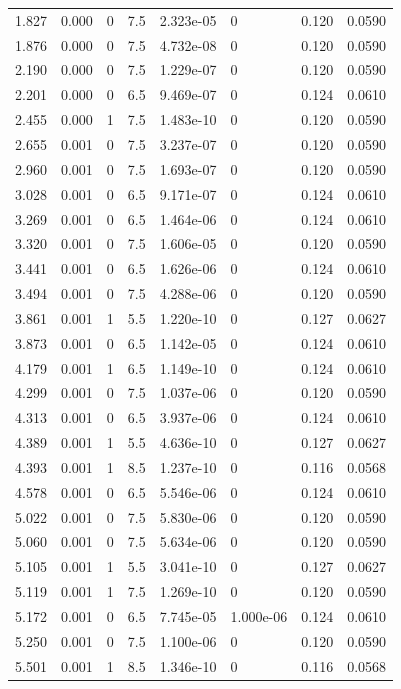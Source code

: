 \documentclass[preview]{standalone}
\begin{document}
{{\begin{tabular}{L{1.2cm}C{1.2cm} C{0.3cm}C{0.5cm} C{1.4cm}C{1.4cm} C{1.4cm}C{1.4cm}}
  1.827  &  0.000  & 0     & 7.5 &  2.323e-05  & 0  & 0.120 &  0.0590   \\ 
  1.876  &  0.000  & 0     & 7.5 &  4.732e-08  & 0  & 0.120 &  0.0590   \\ 
  2.190  &  0.000  & 0     & 7.5 &  1.229e-07  & 0  & 0.120 &  0.0590   \\ 
  2.201  &  0.000  & 0     & 6.5 &  9.469e-07  & 0  & 0.124 &  0.0610   \\ 
  2.455  &  0.000  & 1     & 7.5 &  1.483e-10  & 0  & 0.120 &  0.0590   \\ 
  2.655  &  0.001  & 0     & 7.5 &  3.237e-07  & 0  & 0.120 &  0.0590   \\ 
  2.960  &  0.001  & 0     & 7.5 &  1.693e-07  & 0  & 0.120 &  0.0590   \\ 
  3.028  &  0.001  & 0     & 6.5 &  9.171e-07  & 0  & 0.124 &  0.0610   \\ 
  3.269  &  0.001  & 0     & 6.5 &  1.464e-06  & 0  & 0.124 &  0.0610   \\ 
  3.320  &  0.001  & 0     & 7.5 &  1.606e-05  & 0  & 0.120 &  0.0590   \\ 
  3.441  &  0.001  & 0     & 6.5 &  1.626e-06  & 0  & 0.124 &  0.0610   \\ 
  3.494  &  0.001  & 0     & 7.5 &  4.288e-06  & 0  & 0.120 &  0.0590   \\ 
  3.861  &  0.001  & 1     & 5.5 &  1.220e-10  & 0  & 0.127 &  0.0627   \\ 
  3.873  &  0.001  & 0     & 6.5 &  1.142e-05  & 0  & 0.124 &  0.0610   \\ 
  4.179  &  0.001  & 1     & 6.5 &  1.149e-10  & 0  & 0.124 &  0.0610   \\ 
  4.299  &  0.001  & 0     & 7.5 &  1.037e-06  & 0  & 0.120 &  0.0590   \\ 
  4.313  &  0.001  & 0     & 6.5 &  3.937e-06  & 0  & 0.124 &  0.0610   \\ 
  4.389  &  0.001  & 1     & 5.5 &  4.636e-10  & 0  & 0.127 &  0.0627   \\ 
  4.393  &  0.001  & 1     & 8.5 &  1.237e-10  & 0  & 0.116 &  0.0568   \\ 
  4.578  &  0.001  & 0     & 6.5 &  5.546e-06  & 0  & 0.124 &  0.0610   \\ 
  5.022  &  0.001  & 0     & 7.5 &  5.830e-06  & 0  & 0.120 &  0.0590   \\ 
  5.060  &  0.001  & 0     & 7.5 &  5.634e-06  & 0  & 0.120 &  0.0590   \\ 
  5.105  &  0.001  & 1     & 5.5 &  3.041e-10  & 0  & 0.127 &  0.0627   \\ 
  5.119  &  0.001  & 1     & 7.5 &  1.269e-10  & 0  & 0.120 &  0.0590   \\ 
  5.172  &  0.001  & 0     & 6.5 &  7.745e-05  & 1.000e-06  & 0.124 &  0.0610   \\ 
  5.250  &  0.001  & 0     & 7.5 &  1.100e-06  & 0  & 0.120 &  0.0590   \\ 
  5.501  &  0.001  & 1     & 8.5 &  1.346e-10  & 0  & 0.116 &  0.0568   \\ 
\hline 
\end{tabular} 

}}
\end{document}
